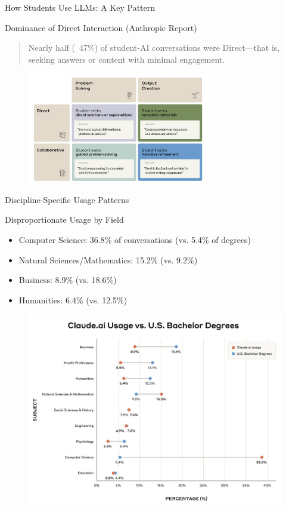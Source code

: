 \documentclass{beamer}
\begin{document}
\begin{frame}{How Students Use LLMs: A Key Pattern}

\begin{block}{Dominance of Direct Interaction (Anthropic Report)}
\blockquote{Nearly half (~47\%) of student-AI conversations were Direct—that is, seeking answers or content with minimal engagement.}
\end{block}

 \begin{figure}
 \centering
 \includegraphics[width=8cm]{../src/cs12/images/cs12-llm-student_interaction_styles.png} %
\end{figure}

\end{frame}

\begin{frame}{Discipline-Specific Usage Patterns}
\begin{block}{Disproportionate Usage by Field}
\begin{itemize}
  \item Computer Science: 36.8\% of conversations (vs. 5.4\% of degrees)
  \item Natural Sciences/Mathematics: 15.2\% (vs. 9.2\%)
  \item Business: 8.9\% (vs. 18.6\%)
  \item Humanities: 6.4\% (vs. 12.5\%)
\end{itemize}
\end{block}
\begin{figure}
    \centering
    \includegraphics[width=0.5\linewidth]{../src/cs12/images/cs12-llm-discipline_usage.png}
\end{figure}
\end{frame}
\end{document}
